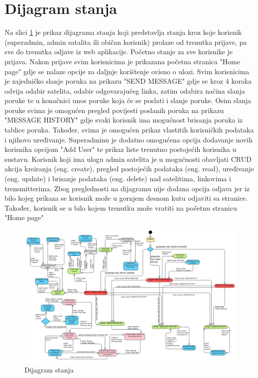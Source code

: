 		
		
		
		\eject
		\section{Dijagram stanja}
		
		
		{	Na slici  \ref{fig:dijagramStanja} je prikaz dijagrama stanja koji predstavlja stanja kroz koje korisnik (superadmin, admin satalita ili 
		običan korisnik) prolaze od trenutka prijave, pa sve do trenutka odjave iz web aplikacije. Početno stanje 
		za sve korisnike je prijava. Nakon prijave svim korisnicima je prikazana početna stranica "Home page" gdje se
		nalaze opcije za daljnje korištenje ovisno o ulozi.
		Svim korisnicima je zajedničko slanje poruka na prikazu "SEND MESSAGE" gdje se kroz 4 koraka odvija odabir
		satelita, odabir odgovarajučeg linka, zatim odabira načina slanja poruke te u konačnici unos poruke koja će se 
		poslati i slanje poruke. Osim slanja poruke svima je omogućen pregled povijesti poslanih poruka na prikazu 
		"MESSAGE HISTORY" gdje svaki korisnik ima mogućnost brisanja poruka iz tablice poruka. Također, svima je omogućen
		prikaz vlastitih korisničkih podataka i njihovo uređivanje.
		Superadminu je dodatno omogućena opcija dodavanje novih korisnika opcijom "Add User" te prikaz liste 
		trenutno postojećih korisnika u sustavu.
		Korisnik koji ima ulogu admin satelita je u mogućnosti obavljati CRUD akcija kreiranja (eng. create), 
		pregled postojećih podataka (eng. read), uređivanje (eng. update) i brisanje podataka (eng. delete) nad satelitima, 
		linkovima i trensmitterima.
		Zbog preglednosti na dijagramu nije dodana opcija odjava jer iz bilo kojeg prikaza se korisnik može u 
		gornjem desnom kutu odjaviti sa stranice. Također, korisnik se u bilo kojem trenutku može vratiti na početnu 
		stranicu "Home page"}
		
		

		
		
		\begin{figure}[H]
			\includegraphics[width=\linewidth]{Diagram_stanja.png}
			\caption{Dijagram stanja}
			\label{fig:dijagramStanja}
		\end{figure}
		
